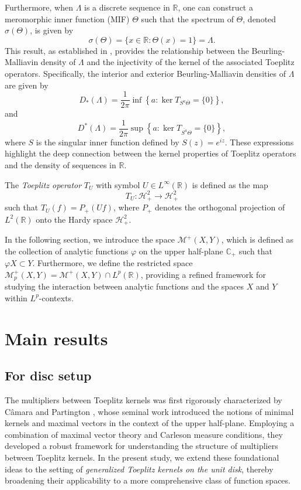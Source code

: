 \documentclass[12pt,a4paper]{amsart}
\begin{document}
Furthermore, when \( \Lambda \) is a discrete sequence in \( \mathbb{R} \), one can construct a meromorphic inner function (MIF) \( \Theta \) such that the spectrum of \( \Theta \), denoted \( \sigma(\Theta) \), is given by
\[
\sigma(\Theta) = \{ x \in \mathbb{R} : \Theta(x) = 1 \} = \Lambda.
\]
This result, as established in \cite{marakov2005, Mitkovski2010}, provides the relationship between the Beurling-Malliavin density of \( \Lambda \) and the injectivity of the kernel of the associated Toeplitz operators. Specifically, the interior and exterior Beurling-Malliavin densities of \( \Lambda \) are given by
\[
D_\ast(\Lambda) = \frac{1}{2\pi} \inf \left\{ a : \ker T_{S^a \overline{\Theta}} = \{ 0 \} \right\},
\]
and
\[
D^\ast(\Lambda) = \frac{1}{2\pi} \sup \left\{ a : \ker T_{\overline{S^a} \Theta} = \{ 0 \} \right\},
\]
where \( S \) is the singular inner function defined by \( S(z) = e^{iz} \). These expressions highlight the deep connection between the kernel properties of Toeplitz operators and the density of sequences in \( \mathbb{R} \).

The \emph{Toeplitz operator} \( T_U \) with symbol \( U \in L^\infty(\mathbb{R}) \) is defined as the map
\[
T_U: \mathcal{H}^{2}_+ \longrightarrow \mathcal{H}^{2}_+
\]
such that \( T_U(f) = P_+ (Uf) \), where \( P_+ \) denotes the orthogonal projection of \( L^2(\mathbb{R}) \) onto the Hardy space \( \mathcal{H}^2_+ \).

In the following section, we introduce the space \( \mathcal{M}^+(X, Y) \), which is defined as the collection of analytic functions \( \varphi \) on the upper half-plane \( \mathbb{C}_+ \) such that \( \varphi X \subset Y \). Furthermore, we define the restricted space \( \mathcal{M}_p^+(X, Y) = \mathcal{M}^+(X, Y) \cap L^p(\mathbb{R}) \), providing a refined framework for studying the interaction between analytic functions and the spaces \( X \) and \( Y \) within \( L^p \)-contexts.


\section{Main results } \label{sec3}


\subsection{For disc setup}
The multipliers between Toeplitz kernels was first rigorously characterized by C{\^a}mara and Partington \cite{camara2018multipliers}, whose seminal work introduced the notions of minimal kernels and maximal vectors in the context of the upper half-plane. Employing a combination of maximal vector theory and Carleson measure conditions, they developed a robust framework for understanding the structure of multipliers between Toeplitz kernels. In the present study, we extend these foundational ideas to the setting of \emph{generalized Toeplitz kernels on the unit disk}, thereby broadening their applicability to a more comprehensive class of function spaces.
\end{document}

